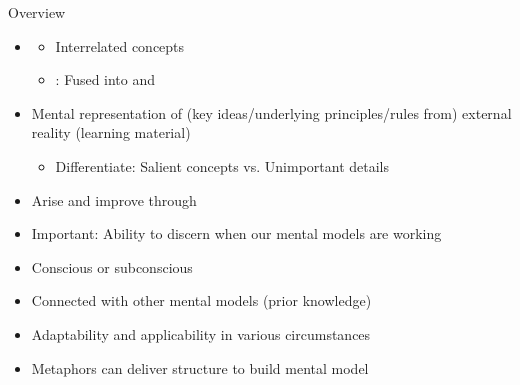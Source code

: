 \documentclass{ercisbeamer}
\begin{document}
\begin{frame}{Overview}
    \begin{tbox}
        \begin{itemize}
            \item {}
            \begin{itemize}
                \item Interrelated concepts 
                \item {}: Fused into  and 
            \end{itemize}
            \item Mental representation of (key ideas/underlying principles/rules from) external reality (learning material)
            \begin{itemize}
                \item Differentiate: Salient concepts vs. Unimportant details
            \end{itemize}
            \item Arise and improve through 
            \item Important: Ability to discern when our mental models are  working
            \item Conscious or subconscious
            \item Connected with other mental models (prior knowledge)
            \item Adaptability and applicability in various circumstances
            \item Metaphors can deliver structure to build mental model
        \end{itemize}
    \end{tbox}
\end{frame}
\end{document}
